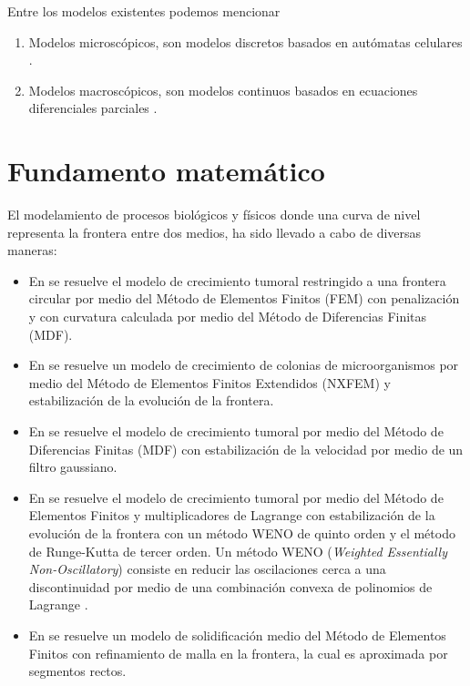 
Entre los modelos existentes podemos mencionar 
\begin{enumerate}
	\item Modelos microscópicos, son modelos discretos basados en autómatas celulares
	\citep{interian2017tumor}. 
	\item Modelos macroscópicos, son modelos continuos basados en ecuaciones diferenciales parciales \citep{mantilla2010}.
\end{enumerate}
\section{Fundamento matemático}
El modelamiento de procesos biológicos y físicos donde una curva de nivel representa la frontera entre dos medios, ha sido  llevado a cabo de diversas maneras:
\begin{itemize}
	\item En \citep{mantilla2010} se resuelve el modelo de crecimiento tumoral restringido a una frontera circular por medio del Método de Elementos Finitos (FEM) con penalización y con curvatura calculada por medio del Método de Diferencias Finitas (MDF).
	\item En \citep{dinh2018finite} se resuelve un modelo de crecimiento de colonias de microorganismos  por medio del Método de Elementos Finitos Extendidos (NXFEM) y estabilización de la evolución de la frontera. 
	\item  En \citep{macklin2005evolving} se resuelve el modelo de crecimiento tumoral por medio del Método de Diferencias Finitas (MDF) con estabilización de la velocidad por medio de un filtro gaussiano.		\item  En \citep{calzada2011fictitious} se resuelve el modelo de crecimiento tumoral por medio del Método de Elementos Finitos y multiplicadores de Lagrange con estabilización de la evolución de la frontera con un método WENO de quinto orden y el método de Runge-Kutta de tercer orden. Un método WENO (\emph{Weighted Essentially Non-Oscillatory}) consiste en reducir las oscilaciones cerca a una discontinuidad por medio de una combinación convexa de polinomios de Lagrange  \citep{hang2021conservative}.
	
	\item  En  \citep{shopple2009interface} se resuelve un modelo de solidificación medio del Método de Elementos Finitos con refinamiento de malla en la frontera, la cual es aproximada por segmentos rectos. 
\end{itemize}
